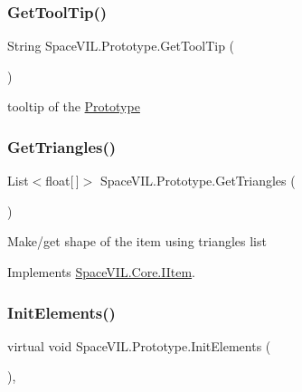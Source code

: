 \subsubsection{\texorpdfstring{Get\+Tool\+Tip()}{GetToolTip()}}
{\footnotesize\ttfamily String Space\+V\+I\+L.\+Prototype.\+Get\+Tool\+Tip (\begin{DoxyParamCaption}{ }\end{DoxyParamCaption})\hspace{0.3cm}{\ttfamily [inline]}}



tooltip of the \mbox{\hyperlink{class_space_v_i_l_1_1_prototype}{Prototype}} 

\mbox{\label{class_space_v_i_l_1_1_prototype_af033781dfb15abb603274625f90d97de}} 
\subsubsection{\texorpdfstring{Get\+Triangles()}{GetTriangles()}}
{\footnotesize\ttfamily List$<$float\mbox{[}$\,$\mbox{]}$>$ Space\+V\+I\+L.\+Prototype.\+Get\+Triangles (\begin{DoxyParamCaption}{ }\end{DoxyParamCaption})\hspace{0.3cm}{\ttfamily [inline]}}



Make/get shape of the item using triangles list 



Implements \mbox{\hyperlink{interface_space_v_i_l_1_1_core_1_1_i_item}{Space\+V\+I\+L.\+Core.\+I\+Item}}.

\mbox{\label{class_space_v_i_l_1_1_prototype_ac3379fe02923ee155b5b0084abf27420}} 
\subsubsection{\texorpdfstring{Init\+Elements()}{InitElements()}}
{\footnotesize\ttfamily virtual void Space\+V\+I\+L.\+Prototype.\+Init\+Elements (\begin{DoxyParamCaption}{ }\end{DoxyParamCaption})\hspace{0.3cm}{\ttfamily [inline]}, {\ttfamily [virtual]}}



